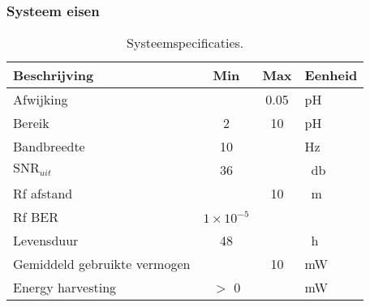 \begin{frame}
    \frametitle{Systeem eisen}

    \begin{table}[ht]
        \centering
        \begin{tabular}{|l|c c|l|}
            \hline
            Beschrijving                 & Min               & Max   & Eenheid           \\
            \hline 
            Afwijking                    &                   & 0.05  & pH                \\ 
            Bereik                       & 2                 & 10    & pH                \\
            Bandbreedte                  & 10                &       & Hz                \\
            $\mathrm{SNR}_{uit}$         & 36                &       & \qty{}{\decibel}  \\
            Rf afstand                   &                   & 10    & \qty{}{\meter}    \\
            Rf BER                       & $1\times10^{-5}$  &       &                   \\
            Levensduur                   & 48                &       & \qty{}{\hour}     \\
            Gemiddeld gebruikte vermogen &                   & 10    & mW                \\
            Energy harvesting            & $>$ 0             &       & mW                \\
            \hline
        \end{tabular}
        \caption{Systeemspecificaties.}
        \label{tab:systemSpecs}
    \end{table}

\end{frame}